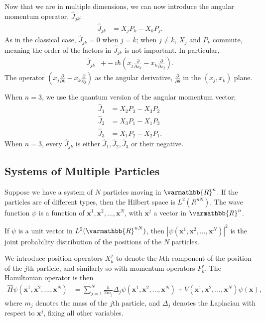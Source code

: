\documentclass[12pt]{extarticle}
\newcommand{\R}{\varmathbb{R}}
\theoremstyle{plain}
\theoremstyle{definition}
\theoremstyle{remark}
\renewcommand{\newline}{\hfill\break}
\begin{document}
  Now that we are in multiple dimensions, we can now introduce the angular momentum operator, $\hat{J}_{jk}$:
  \begin{align*}
    \hat{J}_{jk} &= X_jP_k - X_kP_j.
  \end{align*}
  As in the classical case, $\hat{J}_{jk} = 0$ when $j=k$; when $j\neq k$, $X_j$ and $P_k$ commute, meaning the order of the factors in $\hat{J}_{jk}$ is not important. In particular,
  \begin{align*}
    \hat{J}_{jk} &+ -i\hbar \left(x_j\frac{\partial}{\partial x_k} - x_k\frac{\partial}{\partial x_j}\right).
  \end{align*}
  The operator $\displaystyle \left(x_j\frac{\partial}{\partial k} - x_k\frac{\partial}{\partial j}\right)$ as the angular derivative, $\frac{\partial}{\partial \theta}$ in the $(x_j,x_k)$ plane.\newline

  When $n=3$, we use the quantum version of the angular momentum vector;
  \begin{align*}
    \hat{J}_1 &= X_2P_3 - X_3P_2\\
    \hat{J}_2 &= X_3P_1 - X_1P_3\\
    \hat{J}_3 &= X_1P_2 - X_2P_1.
  \end{align*}
  When $n=3$, every $\hat{J}_{jk}$ is either $\hat{J}_1,\hat{J}_2,\hat{J}_3$ or their negative.
  \subsection{Systems of Multiple Particles}%
  Suppose we have a system of $N$ particles moving in $\R^n$. If the particles are of different types, then the Hilbert space is $L^2(R^{nN})$. The wave function $\psi$ is a function of $\mathbf{x}^1,\mathbf{x}^2,\dots,\mathbf{x}^N$, with $\mathbf{x}^j$ a vector in $\R^n$.\newline

  If $\psi$ is a unit vector in $L^{2}(\R^{nN})$, then $|\psi(\mathbf{x}^1,\mathbf{x}^2,\dots,\mathbf{x}^N)|^2$ is the joint probability distribution of the positions of the $N$ particles.\newline

  We introduce position operators $X_{k}^{j}$ to denote the $k$th component of the position of the $j$th particle, and similarly so with momentum operators $P_{k}^{j}$. The Hamiltonian operator is then
  \begin{align*}
    \hat{H}\psi\left(\mathbf{x}^1,\mathbf{x}^2,\dots,\mathbf{x}^N\right) &= \sum_{j=1}^{N}\frac{\hbar}{2m_j}\Delta_{j}\psi(\mathbf{x}^1,\mathbf{x}^2,\dots,\mathbf{x}^N) + V(\mathbf{x}^1,\mathbf{x}^2,\dots,\mathbf{x}^N)\psi(\mathbf{x}),
  \end{align*}
  where $m_j$ denotes the mass of the $j$th particle, and $\Delta_{j}$ denotes the Laplacian with respect to $\mathbf{x}^j$, fixing all other variables.\newline
\end{document}
